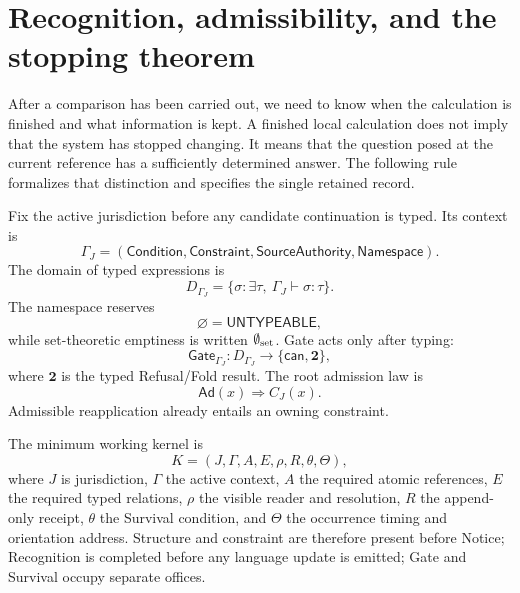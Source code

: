 \documentclass[10pt]{article}
\begin{document}
\section{Recognition, admissibility, and the stopping theorem}\label{sec:recog}
After a comparison has been carried out, we need to know when the calculation is finished and what information is kept. A finished local calculation does not imply that the system has stopped changing. It means that the question posed at the current reference has a sufficiently determined answer. The following rule formalizes that distinction and specifies the single retained record.

Fix the active jurisdiction before any candidate continuation is typed. Its context is
\begin{equation}
\boxed{\Gamma_J=(\mathsf{Condition},\mathsf{Constraint},
\mathsf{SourceAuthority},\mathsf{Namespace}).}
\end{equation}
The domain of typed expressions is
\begin{equation}
D_{\Gamma_J}=\{\sigma:\exists\tau,\ \Gamma_J\vdash\sigma:\tau\}.
\end{equation}
The namespace reserves
\begin{equation}
\boxed{\varnothing=\mathsf{UNTYPEABLE}},
\end{equation}
while set-theoretic emptiness is written $\emptyset_{\rm set}$. Gate acts only after typing:
\begin{equation}
\boxed{\mathsf{Gate}_{\Gamma_J}:D_{\Gamma_J}
\longrightarrow\{\mathsf{can},\mathbf2\},}
\end{equation}
where $\mathbf2$ is the typed Refusal/Fold result. The root admission law is
\begin{equation}
\boxed{\mathsf{Ad}(x)\Longrightarrow C_J(x).}
\end{equation}
Admissible reapplication already entails an owning constraint.

The minimum working kernel is
\begin{equation}
\boxed{K=(J,\Gamma,A,E,\rho,R,\theta,\Theta),}
\end{equation}
where $J$ is jurisdiction, $\Gamma$ the active context, $A$ the required atomic references, $E$ the required typed relations, $\rho$ the visible reader and resolution, $R$ the append-only receipt, $\theta$ the Survival condition, and $\Theta$ the occurrence timing and orientation address. Structure and constraint are therefore present before Notice; Recognition is completed before any language update is emitted; Gate and Survival occupy separate offices.
\end{document}
